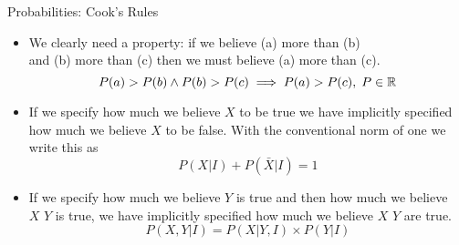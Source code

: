 \documentclass[mathserif, aspectratio=169]{beamer}
\begin{document}
\begin{frame}{Probabilities: Cook's Rules}
	\begin{itemize}
		\item We clearly need a  property: if we believe (a) more than (b)\\
			and (b) more than (c) then we must believe (a) more than (c).
			\[ P(a) > P(b) \land P(b) > P(c) \implies P(a) > P(c),\; P \in \mathbb{R} \]
		\item If we specify how much we believe $X$ to be true we have implicitly specified how much
			we believe $X$ to be false. With the conventional norm of one we write this as
			\[ P(X\vert I) + P(\bar{X}\vert I) = 1 \]
		\item If we specify how much we believe $Y$ is true and then how much we believe\\
			$X$  $Y$ is true, we have implicitly specified how much we believe $X$  $Y$ are true.
			\[ P(X, Y\vert I) = P(X\vert Y, I) \times P(Y\vert I) \]
	\end{itemize}
\end{frame}
\end{document}
